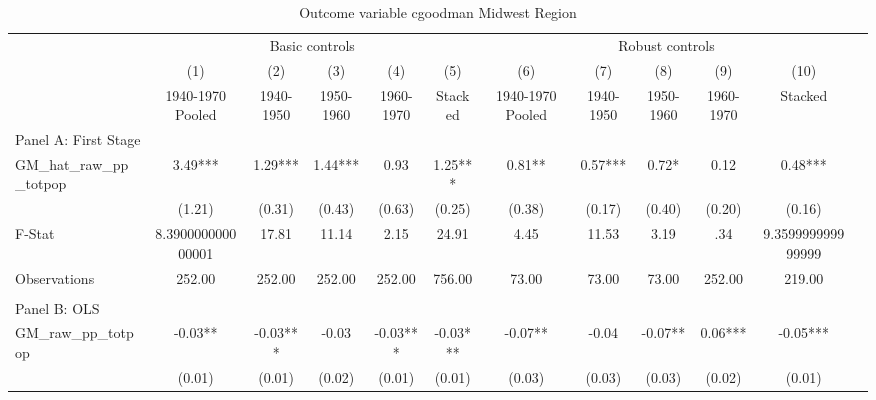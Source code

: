  \begin{table}[htbp]\centering {} \begin{threeparttable} \caption{Outcome variable cgoodman Midwest Region} \begin{tabular}{l*{11}{c}} \toprule
          &\multicolumn{5}{c}{Basic controls}                                   &\multicolumn{5}{c}{Robust controls}                                  \\\cmidrule(lr){2-6}\cmidrule(lr){7-11}
          &\multicolumn{1}{c}{(1)}&\multicolumn{1}{c}{(2)}&\multicolumn{1}{c}{(3)}&\multicolumn{1}{c}{(4)}&\multicolumn{1}{c}{(5)}&\multicolumn{1}{c}{(6)}&\multicolumn{1}{c}{(7)}&\multicolumn{1}{c}{(8)}&\multicolumn{1}{c}{(9)}&\multicolumn{1}{c}{(10)}\\
          &\multicolumn{1}{c}{1940-1970 Pooled}&\multicolumn{1}{c}{1940-1950}&\multicolumn{1}{c}{1950-1960}&\multicolumn{1}{c}{1960-1970}&\multicolumn{1}{c}{Stacked}&\multicolumn{1}{c}{1940-1970 Pooled}&\multicolumn{1}{c}{1940-1950}&\multicolumn{1}{c}{1950-1960}&\multicolumn{1}{c}{1960-1970}&\multicolumn{1}{c}{Stacked}\\
\cmidrule(lr){1-11}
\multicolumn{10}{l}{Panel A: First Stage}\\
\cmidrule(lr){1-11}
GM\_hat\_raw\_pp\_totpop&      3.49***&      1.29***&      1.44***&      0.93   &      1.25***&      0.81** &      0.57***&      0.72*  &      0.12   &      0.48***\\
          &    (1.21)   &    (0.31)   &    (0.43)   &    (0.63)   &    (0.25)   &    (0.38)   &    (0.17)   &    (0.40)   &    (0.20)   &    (0.16)   \\
\midrule
F-Stat    &8.390000000000001   &     17.81   &     11.14   &      2.15   &     24.91   &      4.45   &     11.53   &      3.19   &       .34   &9.359999999999999   \\
Observations&    252.00   &    252.00   &    252.00   &    252.00   &    756.00   &     73.00   &     73.00   &     73.00   &    252.00   &    219.00   \\
\cmidrule[\heavyrulewidth](lr){1-11} \\ \cmidrule[\heavyrulewidth](lr){1-11}
\multicolumn{10}{l}{Panel B: OLS}\\
\cmidrule(lr){1-11}
GM\_raw\_pp\_totpop&     -0.03** &     -0.03***&     -0.03   &     -0.03***&     -0.03***&     -0.07** &     -0.04   &     -0.07** &      0.06***&     -0.05***\\
          &    (0.01)   &    (0.01)   &    (0.02)   &    (0.01)   &    (0.01)   &    (0.03)   &    (0.03)   &    (0.03)   &    (0.02)   &    (0.01)   \\

\end{tabular}
\end{threeparttable}
\end{table}

